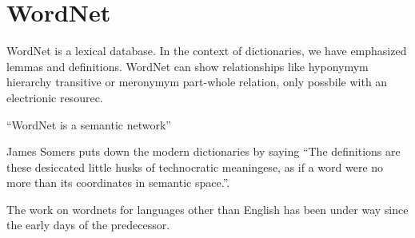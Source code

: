 \section{WordNet}%
\label{sec:wordnet}
WordNet\cite{fellbaum_wordnet_1998-1} is a lexical database.
In the context of dictionaries, we have emphasized lemmas and definitions.
WordNet can show relationships like hyponymym hierarchy transitive or meronymym part-whole relation, only possbile with an electrionic resourec.

\enquote{WordNet is a semantic network}\cite{fellbaum_wordnet_1998-1}

James Somers puts down the modern dictionaries by saying \enquote{The definitions are these desiccated little husks of technocratic meaningese, as if a word were no more than its coordinates in semantic space.}\cite{somers_youre_2014}.

The work on wordnets for languages other than English has been under way since the early days of the predecessor.

